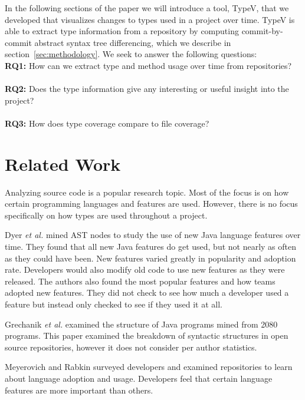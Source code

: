 \documentclass[conference]{IEEEtran}
\begin{document}
In the following sections of the paper we will introduce a tool, TypeV, that we developed that visualizes changes to types used in a project over time. TypeV is able to extract type information from a repository by computing commit-by-commit abstract syntax tree differencing, which we describe in section~\ref{sec:methodology}. We seek to answer the following questions: \\

\textbf{RQ1:} How can we extract type and method usage over time from repositories? \\ \\
\textbf{RQ2:} Does the type information give any interesting or useful insight into the project? \\ \\
\textbf{RQ3:} How does type coverage compare to file coverage?

\section{Related Work}

Analyzing source code is a popular research topic. Most of the focus is on how certain programming languages and features are used. However, there is no focus specifically on how types are used throughout a project.

Dyer \textit{et al.} \cite{Dyer:2014:MBA:2568225.2568295} mined AST nodes to study the use of new Java language features over time. They found that all new Java features do get used, but not nearly as often as they could have been. New features varied greatly in popularity and adoption rate. Developers would also modify old code to use new features as they were released. The authors also found the most popular features and how teams adopted new features. They did not check to see how much a developer used a feature but instead only checked to see if they used it at all.

Grechanik \textit{et al.} \cite{Grechanik:2010:EIL:1852786.1852801} examined the structure of Java programs mined from 2080 programs. This paper examined the breakdown of syntactic structures in open source repositories, however it does not consider per author statistics. 

Meyerovich and Rabkin \cite{Meyerovich:2013:EAP:2509136.2509515} surveyed developers and examined repositories to learn about language adoption and usage. Developers feel that certain language features are more important than others.
\end{document}
